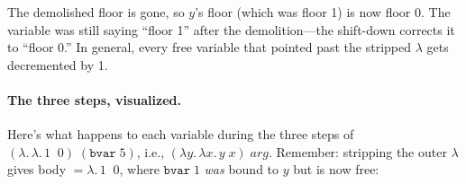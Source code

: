 \documentclass[11pt,a4paper]{article}
\theoremstyle{definition}
\newcommand{\lam}{\lambda}
\begin{document}
\begin{center}
\end{center}

The demolished floor is gone, so $y$'s floor (which was floor 1) is now
floor 0. The variable was still saying ``floor 1'' after the demolition---the
shift-down corrects it to ``floor 0.'' In general, every free variable that
pointed past the stripped $\lam$ gets decremented by 1.

\paragraph{The three steps, visualized.}
Here's what happens to each variable during the three steps of
$(\lam.\, \lam.\, 1\;\;0)\;(\texttt{bvar}\;5)$, i.e., $(\lam y.\, \lam x.\, y\;x)\;\mathit{arg}$.
Remember: stripping the outer $\lam$ gives body $= \lam.\, 1\;\;0$, where
$\texttt{bvar}\;1$ \emph{was} bound to $y$ but is now free:
\end{document}
